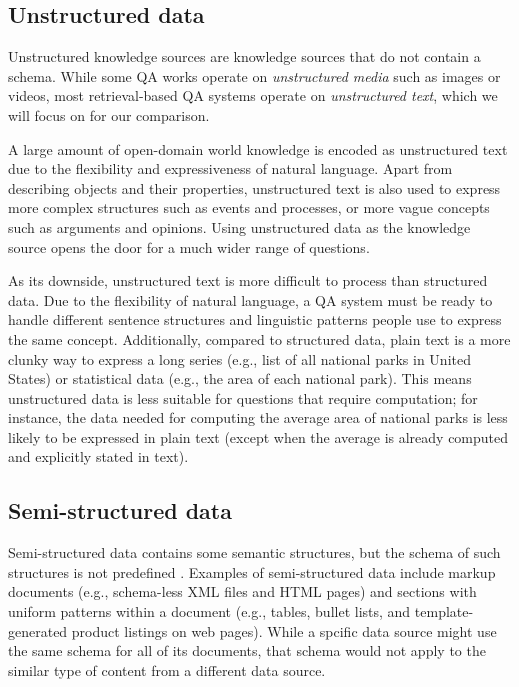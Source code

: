 \subsection{Unstructured data}
\label{sec:rw-unstructured-data}

Unstructured knowledge sources are knowledge sources that
do not contain a schema.
While some QA works operate on \emph{unstructured media}
 such as 
images or videos,
most retrieval-based QA systems 
operate on \emph{unstructured text},
which we will focus on for our comparison.

A large amount of open-domain world knowledge is encoded
as unstructured text due to the flexibility
and expressiveness of natural language.
Apart from describing objects and their properties,
unstructured text is also used to express more complex structures
such as events and processes,
or more vague concepts such as arguments and opinions.
Using unstructured data as the knowledge source
opens the door for a much wider range of questions.

As its downside, unstructured text is more difficult
to process than structured data.
Due to the flexibility of natural language,
a QA system must be ready to handle
different sentence structures and 
linguistic patterns people use to express the same concept.
Additionally, compared to structured data,
plain text is a more clunky way to express a long series
(e.g., list of all national parks in United States)
or statistical data
(e.g., the area of each national park).
This means unstructured data is less suitable for questions
that require computation;
for instance, the data needed for computing the average area
of national parks is less likely to be expressed in plain text
(except when the average is already computed and explicitly stated in text).

\subsection{Semi-structured data}
\label{sec:rw-semi-structured-data}

Semi-structured data contains some semantic structures,
but the schema of such structures is not predefined
\cite{abiteboul1997querying,mchugh1997lore}.
Examples of semi-structured data include markup documents
(e.g., schema-less XML files and HTML pages)
and sections with uniform patterns within a document
(e.g., tables, bullet lists, and template-generated product listings
on web pages).
While a spcific data source might use the same schema
for all of its documents,
that schema would not apply to the similar type of content
from a different data source.

